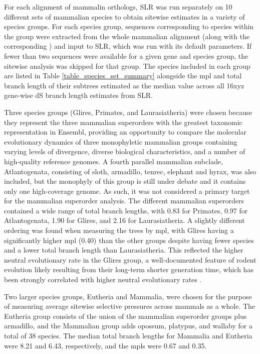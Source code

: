 For each alignment of mammalin orthologs, SLR was run separately on 10
different sets of mammalian species to obtain sitewise estimates in a
variety of species groups. For each species group, sequences
corresponding to species within the group were extracted from the
whole mammalian alignment (along with the corresponding \subtr) and
input to SLR, which was run with its default parameters. If fewer than
two sequences were available for a given gene and species group, the
sitewise analysis was skipped for that group. The species included in
each group are listed in Table \ref{table_species_set_summary} alongside the
\ac{mpl} and total branch length of their subtrees estimated as the
median value across all 16xyz gene-wise dS branch length estimates
from SLR.

Three species groups (Glires, Primates, and Laurasiatheria) were
chosen because they represent the three mammalian superorders with the
greatest taxonomic representation in Ensembl, providing an opportunity
to compare the molecular evolutionary dynamics of three monophyletic
mammalian groups containing varying levels of divergence, diverse
biological characteristics, and a number of high-quality reference
genomes. A fourth parallel mammalian subclade, Atlantogenata,
consisting of sloth, armadillo, tenrec, elephant and hyrax, was also
included, but the monophyly of this group is still under debate
\citep{Murphy2007,Churakov2009} and it contains only one high-coverage
genome. As such, it was not considered a primary target for the
mammalian superorder analysis. The different mammalian superorders
contained a wide range of total branch lengths, with 0.83 for
Primates, 0.97 for Atlantogenata, 1.90 for Glires, and 2.16 for
Laurasiatheria. A slightly different ordering was found when measuring
the trees by \ac{mpl}, with Glires having a significantly higher
\ac{mpl} (0.40) than the other groups despite having fewer species and
a lower total branch length than Laurasiatheria. This reflected the
higher neutral evolutionary rate in the Glires group, a
well-documented feature of rodent evolution likely resulting from
their long-term shorter generation time, which has been strongly
correlated with higher neutral evolutionary rates
\citep{Nikolaev2007,Smith2008}.

Two larger species groups, Eutheria and Mammalia, were chosen for the
purpose of measuring average sitewise selective pressures across
mammals as a whole. The Eutheria group consists of the union of the
mammalian superorder groups plus armadillo, and the Mammalian group
adds opossum, platypus, and wallaby for a total of 38 species. The
median total branch lengths for Mammalia and Eutheria were 8.21 and
6.43, respectively, and the \ac{mpl}s were 0.67 and 0.35.

